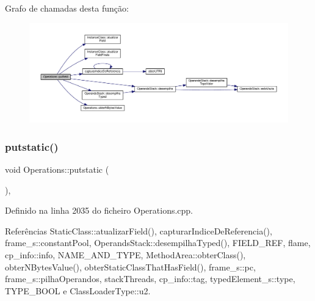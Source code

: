 Grafo de chamadas desta função\+:
\nopagebreak
\begin{figure}[H]
\begin{center}
\leavevmode
\includegraphics[width=350pt]{classOperations_a56385f246d3d4d5c5674c988a1f0e658_cgraph}
\end{center}
\end{figure}
\mbox{\label{classOperations_ac6791ccfd8adf30d8f80b1f679f0b146}} 
\subsubsection{\texorpdfstring{putstatic()}{putstatic()}}
{\footnotesize\ttfamily void Operations\+::putstatic (\begin{DoxyParamCaption}{ }\end{DoxyParamCaption})\hspace{0.3cm}{\ttfamily [static]}, {\ttfamily [private]}}



Definido na linha 2035 do ficheiro Operations.\+cpp.



Referências Static\+Class\+::atualizar\+Field(), capturar\+Indice\+De\+Referencia(), frame\+\_\+s\+::constant\+Pool, Operands\+Stack\+::desempilha\+Typed(), F\+I\+E\+L\+D\+\_\+\+R\+EF, flame, cp\+\_\+info\+::info, N\+A\+M\+E\+\_\+\+A\+N\+D\+\_\+\+T\+Y\+PE, Method\+Area\+::obter\+Class(), obter\+N\+Bytes\+Value(), obter\+Static\+Class\+That\+Has\+Field(), frame\+\_\+s\+::pc, frame\+\_\+s\+::pilha\+Operandos, stack\+Threads, cp\+\_\+info\+::tag, typed\+Element\+\_\+s\+::type, T\+Y\+P\+E\+\_\+\+B\+O\+OL e Class\+Loader\+Type\+::u2.

